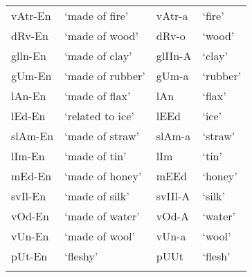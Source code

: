 \documentclass[output=paper, colorlinks, citecolor=brown, newtxmath]{langsci/langscibook}
\begin{document}
\begin{table}
\begin{tabularx}{\textwidth}{ l X l l}
\\  vAtr-En & `made of fire' & vAtr-a & `fire'
\\  dRv-En & `made of wood' & dRv-o & `wood'
\\  glln-En & `made of clay' & glIIn-A & `clay'
\\  gUm-En & `made of rubber' & gUm-a & `rubber'
\\  lAn-En & `made of flax' & lAn & `flax'
\\  lEd-En & `related to ice' & lEEd & `ice'
\\  slAm-En & `made of straw' & slAm-a & `straw'
\\  lIm-En & `made of tin' & lIm & `tin'
\\  mEd-En & `made of honey' & mEEd & `honey'
\\  svIl-En & `made of silk' & svIIl-A & `silk'
\\  vOd-En & `made of water' & vOd-A & `water'
\\  vUn-En & `made of wool' & vUn-a & `wool'
\\  pUt-En & `fleshy' & pUUt & `flesh'
\\
 \lspbottomrule
 \end{tabularx}
\end{table}
\end{document}
